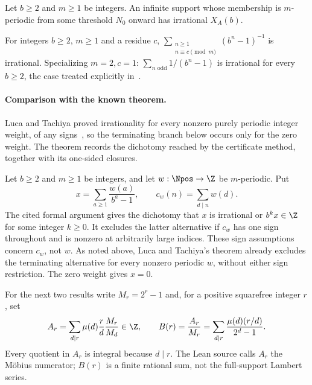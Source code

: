 \begin{thm}
\label{thm:eventually-periodic}
Let $b\ge2$ and $m\ge1$ be integers.  An infinite support whose
membership is $m$-periodic from some threshold $N_0$ onward has
irrational $X_A(b)$.
\end{thm}

\begin{thm}
\label{thm:residue-odd}
For integers $b\ge2$, $m\ge1$ and a residue $c$,
$\sum_{\substack{n\ge1\\n\equiv c\pmod m}}(b^n-1)^{-1}$ is
irrational. Specializing $m=2,c=1$: $\sum_{n\text{ odd}} 1/(b^n-1)$ is irrational for
every $b\ge 2$, the case treated explicitly in~\cite[Example~2, p.~140]{lucatachiya2017}.
\end{thm}

\paragraph{Comparison with the known theorem.} Luca and Tachiya proved irrationality for every
nonzero purely periodic integer weight, of any signs~\cite[Theorem~A, p.~139]{lucatachiya2017}, so
the terminating branch below occurs only for the zero weight.  The theorem records the dichotomy
reached by the certificate method, together with its one-sided closures.

\begin{thm}
\label{thm:signed-periodic}
Let $b\ge2$ and $m\ge1$ be integers, and let
$w:\Npos\to\Z$ be $m$-periodic.  Put
\[
 x=\sum_{a\ge1}\frac{w(a)}{b^a-1},\qquad
 c_w(n)=\sum_{d\mid n}w(d).
\]
The cited formal argument gives the dichotomy that $x$ is
irrational or $b^kx\in\Z$ for some integer $k\ge0$.
It excludes the latter alternative if $c_w$ has one sign
throughout and is nonzero at arbitrarily large indices.
These sign assumptions concern $c_w$, not $w$.
As noted above, Luca and Tachiya's theorem already excludes
the terminating alternative for every nonzero periodic $w$,
without either sign restriction.  The zero weight gives $x=0$.
\end{thm}

For the next two results write $M_r=2^r-1$ and, for a positive
squarefree integer $r$, set
\[
 A_r=\sum_{d\mid r}\mu(d)\frac rd\frac{M_r}{M_d}\in\Z,
 \qquad B(r)=\frac{A_r}{M_r}
           =\sum_{d\mid r}\frac{\mu(d)(r/d)}{2^d-1}.
\]
Every quotient in $A_r$ is integral because $d\mid r$.
The Lean source calls $A_r$ the M\"obius numerator; $B(r)$ is a finite
rational sum, not the full-support Lambert series.

